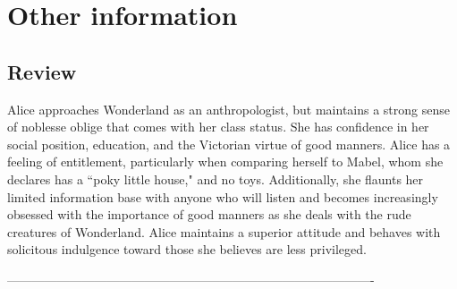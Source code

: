 \documentclass[letterpaper]{twentysecondcv} %
\begin{document}
\section{Other information}

\subsection{Review}

Alice approaches Wonderland as an anthropologist, but maintains a strong sense of noblesse oblige that comes with her class status. She has confidence in her social position, education, and the Victorian virtue of good manners. Alice has a feeling of entitlement, particularly when comparing herself to Mabel, whom she declares has a ``poky little house," and no toys. Additionally, she flaunts her limited information base with anyone who will listen and becomes increasingly obsessed with the importance of good manners as she deals with the rude creatures of Wonderland. Alice maintains a superior attitude and behaves with solicitous indulgence toward those she believes are less privileged.

----------------------------------------------------------------------------------------
\end{document}
